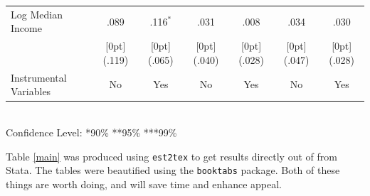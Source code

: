 \documentclass[10pt]{article}
\begin{document}
\begin{table}[h!]
\begin{tabular*}{\textwidth}{@{\extracolsep{\fill}}lcccccc}
Log Median Income &	.089 &	.116$^{*}$ &	.031 &	.008 &	.034 &	.030 \\
&	\raisebox{.7ex}[0pt]{\scriptsize (.119)} &	\raisebox{.7ex}[0pt]{\scriptsize (.065)} &	\raisebox{.7ex}[0pt]{\scriptsize (.040)} &	\raisebox{.7ex}[0pt]{\scriptsize (.028)} &	\raisebox{.7ex}[0pt]{\scriptsize (.047)} &	\raisebox{.7ex}[0pt]{\scriptsize (.028)} \\
\midrule
Instrumental Variables & No & Yes &No&Yes&No&Yes\\
\bottomrule		
\end{tabular*}%
\\Confidence Level: *90\% **95\% ***99\%	
\end{table}
Table \ref{main} was produced using \texttt{est2tex} to get results directly out of from Stata.  The tables were beautified using the \texttt{booktabs} package.  Both of these things are worth doing, and will save time and enhance appeal.
\end{document}
